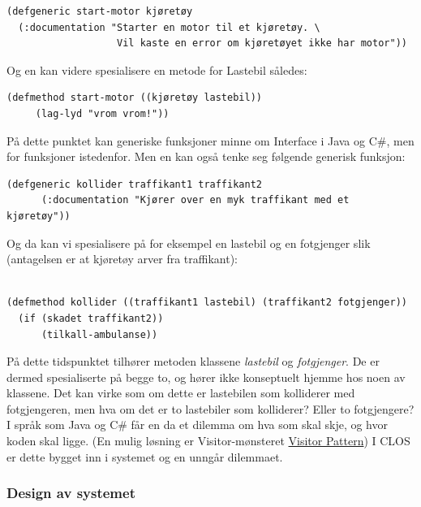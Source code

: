 \documentclass[norsk, 11pt, a4paper]{article}
\begin{document}
\lstset{language=Lisp}
\begin{lstlisting}
(defgeneric start-motor kjøretøy
  (:documentation "Starter en motor til et kjøretøy. \
                   Vil kaste en error om kjøretøyet ikke har motor"))
\end{lstlisting}




Og en kan videre spesialisere en metode for Lastebil således:




\begin{lstlisting}
(defmethod start-motor ((kjøretøy lastebil))
     (lag-lyd "vrom vrom!"))
\end{lstlisting}




På dette punktet kan generiske funksjoner minne om Interface i Java og C\#, men for funksjoner istedenfor. Men en kan også tenke seg følgende generisk funksjon:




\begin{lstlisting}
(defgeneric kollider traffikant1 traffikant2
      (:documentation "Kjører over en myk traffikant med et kjøretøy"))
\end{lstlisting}

Og da kan vi spesialisere på for eksempel en lastebil og en fotgjenger slik (antagelsen er at kjøretøy arver fra traffikant):

\begin{lstlisting}

(defmethod kollider ((traffikant1 lastebil) (traffikant2 fotgjenger))
  (if (skadet traffikant2))
      (tilkall-ambulanse))
\end{lstlisting}




På dette tidspunktet tilhører metoden klassene \emph{lastebil} og \emph{fotgjenger}. De er dermed spesialiserte på begge to, og hører ikke konseptuelt hjemme hos noen av klassene. Det kan virke som om dette er lastebilen som kolliderer med fotgjengeren, men hva om det er to lastebiler som kolliderer? Eller to fotgjengere? I språk som Java og C\# får en da et dilemma om hva som skal skje, og hvor koden skal ligge. (En mulig løsning er Visitor-mønsteret \href{http://en.wikipedia.org/wiki/Visitor(UNDERLINE pattern}{Visitor Pattern}) I CLOS er dette bygget inn i systemet og en unngår dilemmaet.

\subsubsection{Design av systemet}
\end{document}
